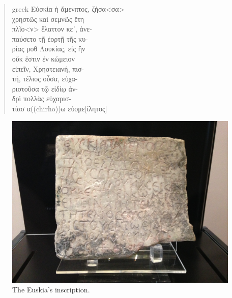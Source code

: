 \documentclass[amsthm,ebook]{saparticle}
\begin{document}
\begin{quotation}
\begin{otherlanguage*}{greek}
\noindent Εὐσκία ἡ ἄμενπτος, ζήσα<σα> \\
χρηστῶς καὶ σεμνῶς ἔτη \\
πλῖο<ν> ἔλαττον κε᾽, ἀνε-\\
παύσετο τῇ ἑορτῇ τῆς κυ-\\ 
ρίας μοθ Λουκίας, εἰς ἢν \\
οὔκ ἐστιν ἐν κώμειον \\
εἰπεῖν, Χρηστειανή, πισ-\\
τή, τέλιος οὖσα, εὐχα-\\ 
ριστοῦσα τῷ εἰδίῳ ἀν-\\
δρὶ πολλὰς εὐχαρισ-\\
τίασ α((chirho))ω εὐομε[ίλητος]
\end{otherlanguage*}
\end{quotation}

\begin{figure}[hbp]
\centering
 \includegraphics[width=\columnwidth]{Euskia.JPG}
\caption{ The Euskia’s inscription.}
\label{fig:3}
\end{figure}
\end{document}

